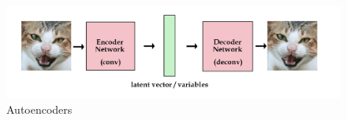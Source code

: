     \begin{figure}[h]
        \centering
        \includegraphics[width=0.8\linewidth]{images/autoencoders.png}
        \caption{Autoencoders \cite{autoencoders_kvfrans}}
        \label{fig:autoencoders}
    \end{figure} 